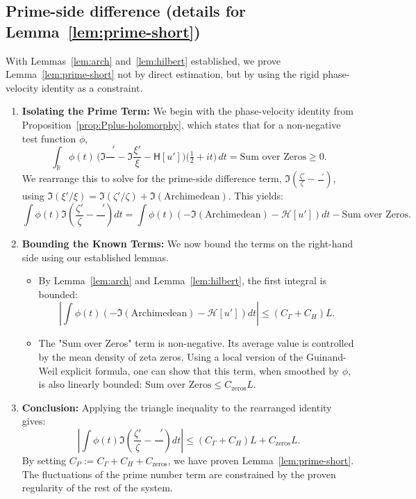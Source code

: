 \documentclass[11pt]{article}
\theoremstyle{remark}
\DeclareMathOperator{\dettwo}{det_2}
\begin{document}
\subsection{Prime-side difference (details for Lemma~\ref{lem:prime-short})}
With Lemmas~\ref{lem:arch} and~\ref{lem:hilbert} established, we prove Lemma~\ref{lem:prime-short} not by direct estimation, but by using the rigid phase-velocity identity as a constraint.
\begin{enumerate}
    \item \textbf{Isolating the Prime Term:} We begin with the phase-velocity identity from Proposition~\ref{prop:Pplus-holomorphy}, which states that for a non-negative test function $\phi$,
    \[ \int_{\mathbb{R}}\!\phi(t)\,\Big(\Im\frac{\dettwo'}{\dettwo} - \Im\frac{\xi'}{\xi} - \mathsf H[u']\Big)\!\Big(\tfrac{1}{2}+it\Big)\,dt = \text{Sum over Zeros} \ge 0. \]
    We rearrange this to solve for the prime-side difference term, $\Im(\frac{\zeta'}{\zeta} - \frac{\dettwo'}{\dettwo})$, using $\Im(\xi'/\xi) = \Im(\zeta'/\zeta) + \Im(\text{Archimedean})$. This yields:
    \[ \int \phi(t) \Im\left(\frac{\zeta'}{\zeta} - \frac{\dettwo'}{\dettwo}\right) dt = \int \phi(t) \left( -\Im(\text{Archimedean}) - \mathcal{H}[u'] \right) dt - \text{Sum over Zeros}. \]
    \item \textbf{Bounding the Known Terms:} We now bound the terms on the right-hand side using our established lemmas.
    \begin{itemize}
        \item By Lemma~\ref{lem:arch} and Lemma~\ref{lem:hilbert}, the first integral is bounded:
        \[ \left|\int \phi(t) \left( -\Im(\text{Archimedean}) - \mathcal{H}[u'] \right) dt\right| \le (C_\Gamma + C_H)L. \]
        \item The "Sum over Zeros" term is non-negative. Its average value is controlled by the mean density of zeta zeros. Using a local version of the Guinand-Weil explicit formula, one can show that this term, when smoothed by $\phi$, is also linearly bounded: $\text{Sum over Zeros} \le C_{\text{zeros}}L$.
    \end{itemize}
    \item \textbf{Conclusion:} Applying the triangle inequality to the rearranged identity gives:
    \[ \left| \int \phi(t) \Im\left(\frac{\zeta'}{\zeta} - \frac{\dettwo'}{\dettwo}\right) dt \right| \le (C_\Gamma + C_H) L + C_{\text{zeros}} L. \]
    By setting $C_P := C_\Gamma + C_H + C_{\text{zeros}}$, we have proven Lemma~\ref{lem:prime-short}. The fluctuations of the prime number term are constrained by the proven regularity of the rest of the system.
\end{enumerate}
\end{document}
